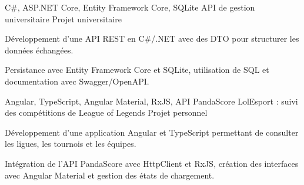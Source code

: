 
\begin{cventries}
  \cventry
    {C\#, ASP.NET Core, Entity Framework Core, SQLite}
    {API de gestion universitaire}
    {Projet universitaire}
    {}
    {
      \begin{cvitems}
        \item {Développement d’une API REST en C\#/.NET avec des DTO pour structurer les données échangées.}
        \item {Persistance avec Entity Framework Core et SQLite, utilisation de SQL et documentation avec Swagger/OpenAPI.}
      \end{cvitems}
    }

  \cventry
    {Angular, TypeScript, Angular Material, RxJS, API PandaScore}
    {LolEsport : suivi des compétitions de League of Legends}
    {Projet personnel}
    {}
    {
      \begin{cvitems}
        \item {Développement d’une application Angular et TypeScript permettant de consulter les ligues, les tournois et les équipes.}
        \item {Intégration de l’API PandaScore avec HttpClient et RxJS, création des interfaces avec Angular Material et gestion des états de chargement.}
      \end{cvitems}
    }
\end{cventries}
